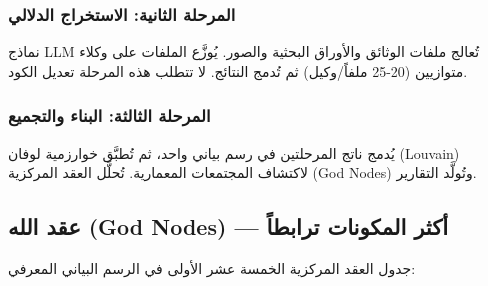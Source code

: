 \documentclass[12pt,a4paper]{article}
\theoremstyle{definition}
\newcommand{\en}[1]{\textenglish{#1}}
\begin{document}
\subsubsection{المرحلة الثانية: الاستخراج الدلالي}

نماذج \en{LLM} تُعالج ملفات الوثائق والأوراق البحثية والصور. يُوزَّع الملفات على وكلاء متوازيين (20-25 ملفاً/وكيل) ثم تُدمج النتائج. لا تتطلب هذه المرحلة تعديل الكود.

\subsubsection{المرحلة الثالثة: البناء والتجميع}

يُدمج ناتج المرحلتين في رسم بياني واحد، ثم تُطبَّق خوارزمية لوفان (\en{Louvain}) لاكتشاف المجتمعات المعمارية. تُحلَّل العقد المركزية (\en{God Nodes}) وتُولَّد التقارير.

\subsection{عقد الله (\en{God Nodes}) --- أكثر المكونات ترابطاً}

جدول العقد المركزية الخمسة عشر الأولى في الرسم البياني المعرفي:
\end{document}
